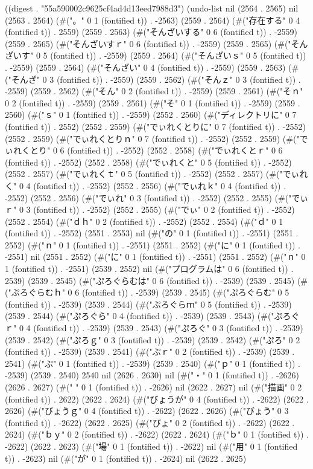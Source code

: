 
((digest . "55a590002c9625cf4ad4d13eed7988d3") (undo-list nil (2564 . 2565) nil (2563 . 2564) (#("。" 0 1 (fontified t)) . -2563) (2559 . 2564) (#("存在する" 0 4 (fontified t)) . 2559) (2559 . 2563) (#("そんざいする" 0 6 (fontified t)) . -2559) (2559 . 2565) (#("そんざいすｒ" 0 6 (fontified t)) . -2559) (2559 . 2565) (#("そんざいす" 0 5 (fontified t)) . -2559) (2559 . 2564) (#("そんざいｓ" 0 5 (fontified t)) . -2559) (2559 . 2564) (#("そんざい" 0 4 (fontified t)) . -2559) (2559 . 2563) (#("そんざ" 0 3 (fontified t)) . -2559) (2559 . 2562) (#("そんｚ" 0 3 (fontified t)) . -2559) (2559 . 2562) (#("そん" 0 2 (fontified t)) . -2559) (2559 . 2561) (#("そｎ" 0 2 (fontified t)) . -2559) (2559 . 2561) (#("そ" 0 1 (fontified t)) . -2559) (2559 . 2560) (#("ｓ" 0 1 (fontified t)) . -2559) (2552 . 2560) (#("ディレクトリに" 0 7 (fontified t)) . 2552) (2552 . 2559) (#("でぃれくとりに" 0 7 (fontified t)) . -2552) (2552 . 2559) (#("でぃれくとりｎ" 0 7 (fontified t)) . -2552) (2552 . 2559) (#("でぃれくとり" 0 6 (fontified t)) . -2552) (2552 . 2558) (#("でぃれくとｒ" 0 6 (fontified t)) . -2552) (2552 . 2558) (#("でぃれくと" 0 5 (fontified t)) . -2552) (2552 . 2557) (#("でぃれくｔ" 0 5 (fontified t)) . -2552) (2552 . 2557) (#("でぃれく" 0 4 (fontified t)) . -2552) (2552 . 2556) (#("でぃれｋ" 0 4 (fontified t)) . -2552) (2552 . 2556) (#("でぃれ" 0 3 (fontified t)) . -2552) (2552 . 2555) (#("でぃｒ" 0 3 (fontified t)) . -2552) (2552 . 2555) (#("でぃ" 0 2 (fontified t)) . -2552) (2552 . 2554) (#("ｄｈ" 0 2 (fontified t)) . -2552) (2552 . 2554) (#("ｄ" 0 1 (fontified t)) . -2552) (2551 . 2553) nil (#("の" 0 1 (fontified t)) . -2551) (2551 . 2552) (#("ｎ" 0 1 (fontified t)) . -2551) (2551 . 2552) (#("に" 0 1 (fontified t)) . -2551) nil (2551 . 2552) (#("に" 0 1 (fontified t)) . -2551) (2551 . 2552) (#("ｎ" 0 1 (fontified t)) . -2551) (2539 . 2552) nil (#("プログラムは" 0 6 (fontified t)) . 2539) (2539 . 2545) (#("ぷろぐらむは" 0 6 (fontified t)) . -2539) (2539 . 2545) (#("ぷろぐらむｈ" 0 6 (fontified t)) . -2539) (2539 . 2545) (#("ぷろぐらむ" 0 5 (fontified t)) . -2539) (2539 . 2544) (#("ぷろぐらｍ" 0 5 (fontified t)) . -2539) (2539 . 2544) (#("ぷろぐら" 0 4 (fontified t)) . -2539) (2539 . 2543) (#("ぷろぐｒ" 0 4 (fontified t)) . -2539) (2539 . 2543) (#("ぷろぐ" 0 3 (fontified t)) . -2539) (2539 . 2542) (#("ぷろｇ" 0 3 (fontified t)) . -2539) (2539 . 2542) (#("ぷろ" 0 2 (fontified t)) . -2539) (2539 . 2541) (#("ぷｒ" 0 2 (fontified t)) . -2539) (2539 . 2541) (#("ぷ" 0 1 (fontified t)) . -2539) (2539 . 2540) (#("ｐ" 0 1 (fontified t)) . -2539) (2539 . 2540) 2540 nil (2626 . 2630) nil (#("・" 0 1 (fontified t)) . -2626) (2626 . 2627) (#(" " 0 1 (fontified t)) . -2626) nil (2622 . 2627) nil (#("描画" 0 2 (fontified t)) . 2622) (2622 . 2624) (#("びょうが" 0 4 (fontified t)) . -2622) (2622 . 2626) (#("びょうｇ" 0 4 (fontified t)) . -2622) (2622 . 2626) (#("びょう" 0 3 (fontified t)) . -2622) (2622 . 2625) (#("びょ" 0 2 (fontified t)) . -2622) (2622 . 2624) (#("ｂｙ" 0 2 (fontified t)) . -2622) (2622 . 2624) (#("ｂ" 0 1 (fontified t)) . -2622) (2622 . 2623) (#("場" 0 1 (fontified t)) . -2622) nil (#("用" 0 1 (fontified t)) . -2623) nil (#("が" 0 1 (fontified t)) . -2624) nil (2622 . 2625) 